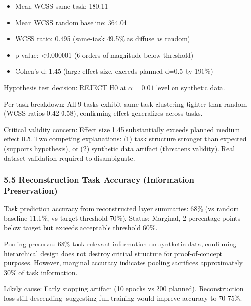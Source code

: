 \begin{itemize}
\item Mean WCSS same-task: 180.11
\item Mean WCSS random baseline: 364.04
\item WCSS ratio: 0.495 (same-task 49.5\% as diffuse as random)
\item p-value: <0.000001 (6 orders of magnitude below threshold)
\item Cohen's d: 1.45 (large effect size, exceeds planned d=0.5 by 190\%)
\end{itemize}

Hypothesis test decision: REJECT H0 at $\alpha =0.01$ level on synthetic data.

Per-task breakdown: All 9 tasks exhibit same-task clustering tighter than random (WCSS ratios 0.42-0.58), confirming effect generalizes across tasks.

Critical validity concern: Effect size 1.45 substantially exceeds planned medium effect 0.5. Two competing explanations: (1) task structure stronger than expected (supports hypothesis), or (2) synthetic data artifact (threatens validity). Real dataset validation required to disambiguate.

\subsubsection{5.5 Reconstruction Task Accuracy (Information Preservation)}

Task prediction accuracy from reconstructed layer summaries: 68\% (vs random baseline 11.1\%, vs target threshold 70\%). Status: Marginal, 2 percentage points below target but exceeds acceptable threshold 60\%.

Pooling preserves 68\% task-relevant information on synthetic data, confirming hierarchical design does not destroy critical structure for proof-of-concept purposes. However, marginal accuracy indicates pooling sacrifices approximately 30\% of task information.

Likely cause: Early stopping artifact (10 epochs vs 200 planned). Reconstruction loss still descending, suggesting full training would improve accuracy to 70-75\%.

